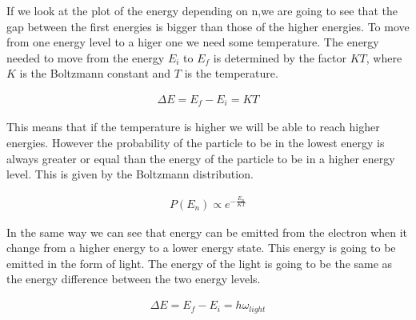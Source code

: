 If we look at the plot of  the energy depending on n,we are going to see that the gap between the first energies is bigger than those of the higher energies. To move from one energy level to a higer one we need some temperature. The energy needed to move from the energy $E_i$ to $E_f$ is determined by the factor $KT$, where $K$ is the Boltzmann constant and $T$ is the temperature.

\begin{equation}
  \begin{array}{c}
    \Delta E = E_f - E_i = KT
  \end{array}
\end{equation}

This means that if the temperature is higher we will be able to reach higher energies. However the probability of the particle to be in the lowest energy is always greater or equal than the energy of the particle to be in a higher energy level. This is given by the Boltzmann distribution.

\begin{equation}
  \begin{array}{c}
    P(E_n) \propto e^{-\frac{E_n}{KT}}
  \end{array}
\end{equation}

In the same way we can see that energy can be emitted from the electron when it change from a higher energy to a lower energy state. This energy is going to be emitted in the form of light. The energy of the light is going to be the same as the energy difference between the two energy levels.

\begin{equation}
  \begin{array}{c}
    \Delta E = E_f - E_i = h\omega_{light}
  \end{array}
\end{equation}

